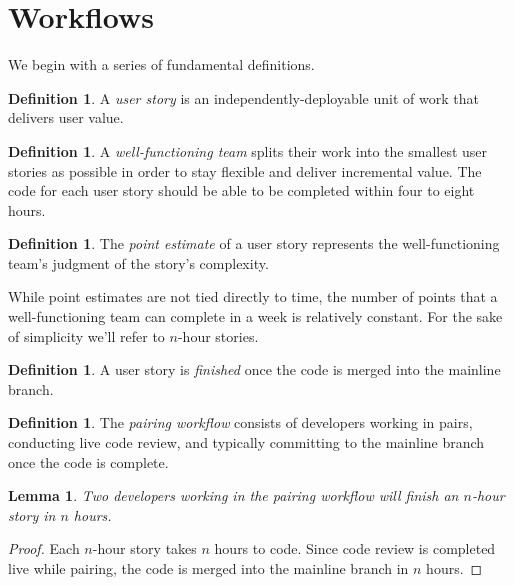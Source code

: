\documentclass[letterpaper]{article}
\newtheorem{lemma}[theorem]{Lemma}
\theoremstyle{definition}
\newtheorem{definition}[theorem]{Definition}
\begin{document}
    \section{Workflows}\label{sec:workflows}

    We begin with a series of fundamental definitions.

    \begin{definition}
        A \textit{user story} is an independently-deployable unit of work that delivers user value.
    \end{definition}

    \begin{definition}
        A \textit{well-functioning team} splits their work into the smallest user stories as possible in order to stay
        flexible and deliver incremental value.
        The code for each user story should be able to be completed within four to eight hours.
    \end{definition}

    \begin{definition}
        The \textit{point estimate} of a user story represents the well-functioning team's judgment of the story's
        complexity.
    \end{definition}

    While point estimates are not tied directly to time, the number of points that a well-functioning team can complete
    in a week is relatively constant.
    For the sake of simplicity we'll refer to $n$-hour stories.

    \begin{definition}
        A user story is \textit{finished} once the code is merged into the mainline branch.
    \end{definition}

    \begin{definition}
        The \textit{pairing workflow} consists of developers working in pairs, conducting live code review, and
        typically committing to the mainline branch once the code is complete.
    \end{definition}

    \begin{lemma}
        \label{lemma:pair}
        Two developers working in the pairing workflow will finish an $n$-hour story in $n$ hours.
    \end{lemma}
    \begin{proof}
        Each $n$-hour story takes $n$ hours to code.
        Since code review is completed live while pairing, the code is merged into the mainline branch in $n$ hours.
    \end{proof}
\end{document}
